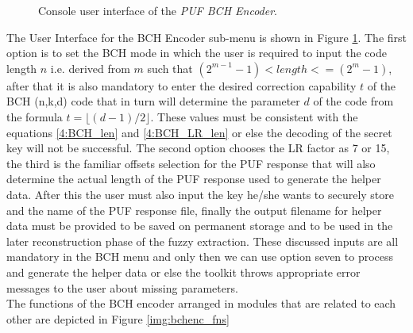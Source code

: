	\begin{figure}
	\centering
	\caption{Console user interface of the \emph{PUF BCH Encoder}.}
	\label{img:4_BCH_ENC_menu}
	\end{figure}
	The User Interface for the BCH Encoder sub-menu is shown in Figure \ref{img:4_BCH_ENC_menu}. The first option is to set the BCH mode in which the user is required to input the code length $n$ i.e. derived from $m$ such that $(2^{m-1} - 1) < length <= (2^m - 1)$, after that it is also mandatory to enter the desired correction capability $t$ of the BCH (n,k,d) code that in turn will determine the parameter $d$ of the code from the formula $t = \lfloor(d-1)/2\rfloor$.
	These values must be consistent with the equations \ref{4:BCH_len} and \ref{4:BCH_LR_len} or else the decoding of the secret key will not be successful. The second option chooses the LR factor as 7 or 15, the third is the familiar offsets selection for the PUF response that will also determine the actual length of the PUF response used to generate the helper data. After this the user must also input the key he/she wants to securely store and the name of the PUF
	response file, finally the output filename for helper data must be provided to be saved on permanent storage and to be used in the later reconstruction phase of the fuzzy extraction. These discussed inputs are all mandatory in the BCH menu and only then we can use option seven to process and generate the helper data or else the toolkit throws appropriate error messages to the user about missing parameters.\\

	The functions of the BCH encoder arranged in modules that are related to each other are depicted in Figure \ref{img:bchenc_fns}


